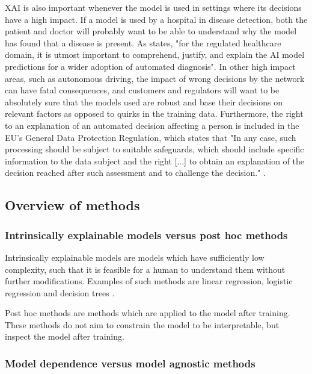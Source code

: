 \documentclass[conference]{IEEEtran}
\begin{document}
XAI is also important whenever the model is used in settings where its decisions have a high impact. If a model is used by a hospital in disease detection, both the patient and doctor will probably want to be able to understand why the model has found that a disease is present. As \cite{xaioverview} states, "for the regulated healthcare domain, it is utmost important to comprehend, justify, and explain the AI model predictions for a wider adoption of automated diagnosis". In other high impact areas, such as autonomous driving, the impact of wrong decisions by the network can have fatal consequences, and customers and regulators will want to be absolutely sure that the models used are robust and base their decisions on relevant factors as opposed to quirks in the training data. Furthermore, the right to an explanation of an automated decision affecting a person is included in the EU's General Data Protection Regulation, which states that "In any case, such processing should be subject to suitable safeguards, which should include specific information to the data subject and the right [...] to obtain an explanation of the decision reached after such assessment and to challenge the decision." \cite{gdpr}.

\subsection{Overview of methods}

\subsubsection{Intrinsically explainable models versus post hoc methods}

Intrinsically explainable models are models which have sufficiently low complexity, such that it is feasible for a human to understand them without further modifications. Examples of such methods are linear regression, logistic regression and decision trees \cite{molnar}. 

Post hoc methods are methods which are applied to the model after training. These methods do not aim to constrain the model to be interpretable, but inspect the model after training.

\subsubsection{Model dependence versus model agnostic methods}
\end{document}
